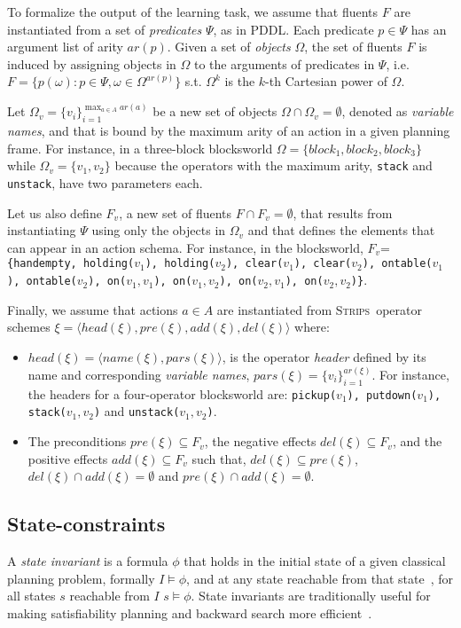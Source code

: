 \documentclass{article}
\newcommand{\tup}[1]{{\langle #1 \rangle}}
\newcommand{\strips}{\textsc{Strips}}     %
\begin{document}
To formalize the output of the learning task, we assume that fluents $F$ are instantiated from a set of {\em predicates} $\Psi$, as in PDDL. Each predicate $p\in\Psi$ has an argument list of arity $ar(p)$. Given a set of {\em objects} $\Omega$, the set of fluents $F$ is induced by assigning objects in $\Omega$ to the arguments of predicates in $\Psi$, i.e.~$F=\{p(\omega):p\in\Psi,\omega\in\Omega^{ar(p)}\}$ s.t. $\Omega^k$ is the $k$-th Cartesian power of $\Omega$.

Let $\Omega_v=\{v_i\}_{i=1}^{\operatorname*{max}_{a\in A} ar(a)}$ be a new set of objects $\Omega\cap\Omega_v=\emptyset$, denoted as {\em variable names}, and that is bound by the maximum arity of an action in a given planning frame. For instance, in a three-block blocksworld $\Omega=\{block_1, block_2, block_3\}$ while $\Omega_v=\{v_1, v_2\}$ because the operators with the maximum arity, {\small\tt stack} and {\small\tt unstack}, have two parameters each.

Let us also define $F_v$, a new set of fluents $F\cap F_v=\emptyset$, that results from instantiating $\Psi$ using only the objects in $\Omega_v$ and that defines the elements that can appear in an action schema. For instance, in the blocksworld, $F_v$={\small\tt\{handempty, holding($v_1$), holding($v_2$), clear($v_1$), clear($v_2$), ontable($v_1$), ontable($v_2$), on($v_1,v_1$), on($v_1,v_2$), on($v_2,v_1$), on($v_2,v_2$)\}}.

Finally, we assume that actions $a\in A$ are instantiated from \strips\ operator schemes $\xi=\tup{head(\xi),pre(\xi),add(\xi),del(\xi)}$ where:
\begin{itemize}
\item $head(\xi)=\tup{name(\xi),pars(\xi)}$, is the operator {\em header} defined by its name and corresponding {\em variable names}, $pars(\xi)=\{v_i\}_{i=1}^{ar(\xi)}$. For instance, the headers for a four-operator blocksworld are: {\small\tt pickup($v_1$), putdown($v_1$), stack($v_1,v_2$)} and {\small\tt unstack($v_1,v_2$)}.
\item The preconditions $pre(\xi)\subseteq F_v$, the negative effects $del(\xi)\subseteq F_v$, and the positive effects $add(\xi)\subseteq F_v$ such that, $del(\xi)\subseteq pre(\xi)$, $del(\xi)\cap add(\xi)=\emptyset$ and $pre(\xi)\cap add(\xi)=\emptyset$.
\end{itemize}


\subsection{State-constraints}
A {\em state invariant} is a formula $\phi$ that holds in the initial state of a given classical planning problem, formally $I\models \phi$, and at any state reachable from that state~\cite{rintanen:schematicInvariants:AAAI2017}, for all states $s$ reachable from $I$ $s\models \phi$. State invariants are traditionally useful for making satisfiability planning and backward search more efficient~\cite{rintanen2014madagascar,alcazar2015reminder}.
\end{document}
